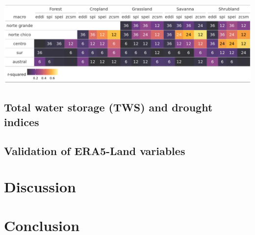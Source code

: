 \documentclass[
  number,
  preprint,
  3p,
  onecolumn]{elsarticle}
\begin{document}
\begin{table}[!ht]
\label{tab-corLandcover}
\caption{}
\includegraphics[]{../output/figs/tabla_r_cor_macro_indice.png}
\end{table}

\hypertarget{total-water-storage-tws-and-drought-indices}{%
\subsection{Total water storage (TWS) and drought
indices}\label{total-water-storage-tws-and-drought-indices}}

\hypertarget{validation-of-era5-land-variables-1}{%
\subsection{Validation of ERA5-Land
variables}\label{validation-of-era5-land-variables-1}}

\hypertarget{discussion}{%
\section{Discussion}\label{discussion}}

\hypertarget{conclusion}{%
\section{Conclusion}\label{conclusion}}


\renewcommand\refname{References}
  
\end{document}
